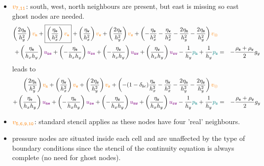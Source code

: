 \begin{itemize}
\item ${\color{orange} v_{\tt 7,11}}$: south,  west, north neighbours are present, but east is missing so east ghost nodes are needed.
\begin{eqnarray}
\left( \frac{2\eta_{\tt n}}{h_y^2} \right) {\color{orange} v_{\tt n}} +
\boxed{\left( \frac{ \eta_{\tt e}}{h_x^2} \right) {\color{orange} v_{\tt e}}} +
\left( \frac{ \eta_{\tt w}}{h_x^2} \right) {\color{orange} v_{\tt w}} +
\left( \frac{2\eta_{\tt s}}{h_y^2} \right) {\color{orange} v_{\tt s}} +
\left( 
-\frac{\eta_{\tt e}}{h_x^2} 
-\frac{\eta_{\tt w}}{h_x^2} 
-\frac{2\eta_{\tt n}}{h_y^2} 
-\frac{2\eta_{\tt s}}{h_y^2} 
\right) {\color{orange} v_\otimes} \nonumber\\
+
\left( \frac{\eta_{\tt e}}{h_x h_y} \right) {\color{violet} u_{\tt ne}} +
\left(-\frac{\eta_{\tt e}}{h_x h_y} \right) {\color{violet} u_{\tt se}} +
\left(-\frac{\eta_{\tt w}}{h_x h_y} \right) {\color{violet} u_{\tt nw}} +
\left( \frac{\eta_{\tt w}}{h_x h_y} \right) {\color{violet} u_{\tt sw}} 
-\frac{1}{h_y} {\color{teal}p_{\tt n}} + \frac{1}{h_y} {\color{teal}p_{\tt s}}
&=& -\frac{\rho_{\tt e}+\rho_{\tt w}}{2} g_y \nonumber
\end{eqnarray}
leads to
\begin{eqnarray}
\left( \frac{2\eta_{\tt n}}{h_y^2} \right) {\color{orange} v_{\tt n}} +
\left( \frac{ \eta_{\tt w}}{h_x^2} \right) {\color{orange} v_{\tt w}} +
\left( \frac{2\eta_{\tt s}}{h_y^2} \right) {\color{orange} v_{\tt s}} +
\left( 
-(1-\delta_{bc})\frac{\eta_{\tt e}}{h_x^2} 
-\frac{\eta_{\tt w}}{h_x^2} 
-\frac{2\eta_{\tt n}}{h_y^2} 
-\frac{2\eta_{\tt s}}{h_y^2} 
\right) {\color{orange} v_\otimes} \nonumber\\
+
\left( \frac{\eta_{\tt e}}{h_x h_y} \right) {\color{violet} u_{\tt ne}} +
\left(-\frac{\eta_{\tt e}}{h_x h_y} \right) {\color{violet} u_{\tt se}} +
\left(-\frac{\eta_{\tt w}}{h_x h_y} \right) {\color{violet} u_{\tt nw}} +
\left( \frac{\eta_{\tt w}}{h_x h_y} \right) {\color{violet} u_{\tt sw}} 
-\frac{1}{h_y} {\color{teal}p_{\tt n}} + \frac{1}{h_y} {\color{teal}p_{\tt s}}
&=& -\frac{\rho_{\tt e}+\rho_{\tt w}}{2} g_y \nonumber
\end{eqnarray}


\item ${\color{orange} v_{\tt 5,6,9,10}}$: standard stencil applies as these nodes have four 'real' neighbours.
\item pressure nodes are situated inside each cell and are unaffected by the type of boundary conditions
since the stencil of the continuity equation is always complete (no need for ghost nodes).
\end{itemize}

